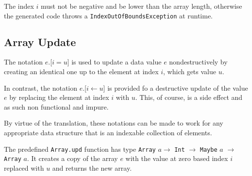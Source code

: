 The index $i$ must not be negative and be lower than the array length, otherwise the generated \java{} code throws a \texttt{IndexOutOfBoundsException} at runtime.

\subsection{Array Update}

The notation $e$.[$i = u$] is used to update a data value $e$ nondestructively by creating an identical one up to the element at index $i$, which gets value $u$.

In contrast, the notation $e$.[$i \leftarrow{} u$] is provided fo a destructive update of the value $e$ by replacing the element at index $i$ with $u$. This, of course, is a side effect and as such non functional and impure.

By virtue of the translation, these notations can be made to work for any appropriate data structure that is an indexable collection of elements.


The predefined \texttt{Array.upd} function has type \texttt{Array} $a \rightarrow$ \texttt{Int} $\rightarrow$ \texttt{Maybe} $a$ $\rightarrow$ \texttt{Array} $a$. It creates a copy of the array $e$ with the value at zero based index $i$ replaced with $u$ and returns the new array.

